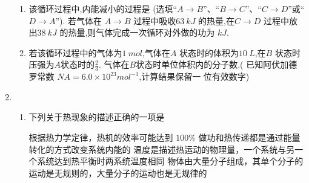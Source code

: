 \begin{enumerate}
\begin{enumerate}
\item 
该循环过程中,内能减小的过程是 \underlinegap  (选填“$ A \rightarrow B $”、“$ B \rightarrow C $”、“$ C \rightarrow D $”或“$ D \rightarrow A $”). 若气体在
$ A \rightarrow B $ 过程中吸收$ 63 \ kJ $ 的热量,在$ C \rightarrow D $ 过程中放出$ 38 \ kJ $ 的热量,则气体完成一次循环对外做的功为 \underlinegap $ kJ $.

\item 
若该循环过程中的气体为$ 1 \ mol $,气体在$ A $ 状态时的体积为$ 10 \ L $,在$ B $ 状态时压强为$ A $状态时的$  \frac{ 2 }{ 3 } 	 $.
气体在$ B $状态时单位体积内的分子数.( 已知阿伏加德罗常数 $ NA=6.0 \times 10^{23} mol^{-1} $,计算结果保留一
位有效数字)





\end{enumerate}




\item 
{}
\begin{enumerate}
	\item
下列关于热现象的描述正确的一项是  


\fourchoices
{根据热力学定律，热机的效率可能达到 $ 100 \% $}
{做功和热传递都是通过能量转化的方式改变系统内能的}
{温度是描述热运动的物理量，一个系统与另一个系统达到热平衡时两系统温度相同}
{物体由大量分子组成，其单个分子的运动是无规则的，大量分子的运动也是无规律的}




\end{enumerate}
\end{enumerate}
